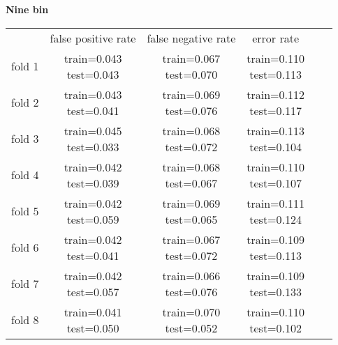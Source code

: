 \documentclass[12pt]{article}
\begin{document}
\clearpage
\textbf{Nine bin} \\
\begin{tabular}{ r|c|c|c|c|c| } \multicolumn{1}{r}{}
& \multicolumn{1}{c}{false positive rate}
& \multicolumn{1}{c}{false negative rate}
& \multicolumn{1}{c}{error rate} \\
\cline{2-4}
fold 1 & \shortstack{train=0.043 \\ test=0.043}& \shortstack{train=0.067 \\ test=0.070}& \shortstack{train=0.110 \\ test=0.113} \\\cline{2-4}
fold 2 & \shortstack{train=0.043 \\ test=0.041}& \shortstack{train=0.069 \\ test=0.076}& \shortstack{train=0.112 \\ test=0.117} \\\cline{2-4}
fold 3 & \shortstack{train=0.045 \\ test=0.033}& \shortstack{train=0.068 \\ test=0.072}& \shortstack{train=0.113 \\ test=0.104} \\\cline{2-4}
fold 4 & \shortstack{train=0.042 \\ test=0.039}& \shortstack{train=0.068 \\ test=0.067}& \shortstack{train=0.110 \\ test=0.107} \\\cline{2-4}
fold 5 & \shortstack{train=0.042 \\ test=0.059}& \shortstack{train=0.069 \\ test=0.065}& \shortstack{train=0.111 \\ test=0.124} \\\cline{2-4}
fold 6 & \shortstack{train=0.042 \\ test=0.041}& \shortstack{train=0.067 \\ test=0.072}& \shortstack{train=0.109 \\ test=0.113} \\\cline{2-4}
fold 7 & \shortstack{train=0.042 \\ test=0.057}& \shortstack{train=0.066 \\ test=0.076}& \shortstack{train=0.109 \\ test=0.133} \\\cline{2-4}
fold 8 & \shortstack{train=0.041 \\ test=0.050}& \shortstack{train=0.070 \\ test=0.052}& \shortstack{train=0.110 \\ test=0.102} \\\cline{2-4}

\end{tabular}
\end{document}
